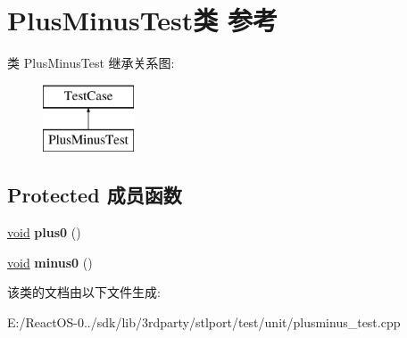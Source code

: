 \hypertarget{class_plus_minus_test}{}\section{Plus\+Minus\+Test类 参考}
\label{class_plus_minus_test}
类 Plus\+Minus\+Test 继承关系图\+:\begin{figure}[H]
\begin{center}
\leavevmode
\includegraphics[height=2.000000cm]{class_plus_minus_test}
\end{center}
\end{figure}
\subsection*{Protected 成员函数}
\begin{DoxyCompactItemize}
\item 
\mbox{\label{class_plus_minus_test_a116ce16abc0f58d86f12d2c90ed891f4}} 
\hyperlink{interfacevoid}{void} {\bfseries plus0} ()
\item 
\mbox{\label{class_plus_minus_test_ac270094799b543482e868eb7d1b12f88}} 
\hyperlink{interfacevoid}{void} {\bfseries minus0} ()
\end{DoxyCompactItemize}


该类的文档由以下文件生成\+:\begin{DoxyCompactItemize}
\item 
E\+:/\+React\+O\+S-\/0../sdk/lib/3rdparty/stlport/test/unit/plusminus\+\_\+test.\+cpp\end{DoxyCompactItemize}

